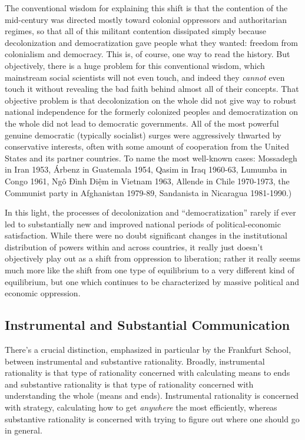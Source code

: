 \documentclass[12pt,book]{article}
\begin{document}
The conventional wisdom for explaining this shift is that the contention
of the mid-century was directed mostly toward colonial oppressors and
authoritarian regimes, so that all of this militant contention
dissipated simply because decolonization and democratization gave people
what they wanted: freedom from colonialism and democracy. This is, of
course, one way to read the history. But objectively, there is a huge
problem for this conventional wisdom, which mainstream social scientists
will not even touch, and indeed they \emph{cannot} even touch it without
revealing the bad faith behind almost all of their concepts. That
objective problem is that decolonization on the whole did not give way
to robust national independence for the formerly colonized peoples and
democratization on the whole did not lead to democratic governments. All
of the most powerful genuine democratic (typically socialist) surges
were aggressively thwarted by conservative interests, often with some
amount of cooperation from the United States and its partner countries.
To name the most well-known cases: Mossadegh in Iran 1953, Árbenz in
Guatemala 1954, Qasim in Iraq 1960-63, Lumumba in Congo 1961, Ngô Đình
Diệm in Vietnam 1963, Allende in Chile 1970-1973, the Communist party in
Afghanistan 1979-89, Sandanista in Nicaragua 1981-1990.)

In this light, the processes of decolonization and ``democratization''
rarely if ever led to substantially new and improved national periods of
political-economic satisfaction. While there were no doubt significant
changes in the institutional distribution of powers within and across
countries, it really just doesn't objectively play out as a shift from
oppression to liberation; rather it really seems much more like the
shift from one type of equilibrium to a very different kind of
equilibrium, but one which continues to be characterized by massive
political and economic oppression.

\subsection{Instrumental and Substantial
Communication}\label{instrumental-and-substantial-communication}

There's a crucial distinction, emphasized in particular by the Frankfurt
School, between instrumental and substantive rationality. Broadly,
instrumental rationality is that type of rationality concerned with
calculating means to ends and substantive rationality is that type of
rationality concerned with understanding the whole (means and ends).
Instrumental rationality is concerned with strategy, calculating how to
get \emph{anywhere} the most efficiently, whereas substantive
rationality is concerned with trying to figure out where one should go
in general.
\end{document}
